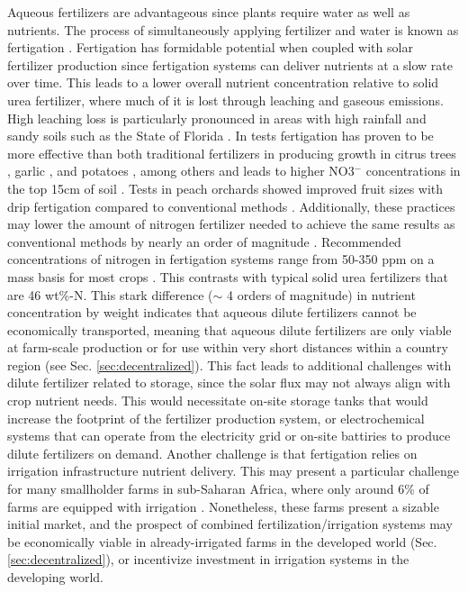 Aqueous fertilizers are advantageous since plants require water as well as nutrients. The process of simultaneously applying fertilizer and water is known as fertigation \cite{kafkafi2011fertigation,goyal2016water}. Fertigation has formidable potential when coupled with solar fertilizer production since fertigation systems can deliver nutrients at a slow rate over time. This leads to a lower overall nutrient concentration relative to solid urea fertilizer, where much of it is lost through leaching and gaseous emissions. High leaching loss is particularly pronounced in areas with high rainfall and sandy soils such as the State of Florida \cite{kadyampakeni_2015}. In tests fertigation has proven to be more effective than both traditional fertilizers in producing growth in citrus trees \cite{Morgan2009}, garlic \cite{Jamil_Mohammad_2002}, and potatoes \cite{Feng_2017}, among others \cite{Bar_Yosef_1999,kafkafi2011fertigation} and leads to higher NO3$^-$ concentrations in the top 15cm of soil \cite{Willis1991}. Tests in peach orchards showed improved fruit sizes with drip fertigation compared to conventional methods \cite{Bryla2005}. Additionally, these practices may lower the amount of nitrogen fertilizer needed to achieve the same results as conventional methods by nearly an order of magnitude \cite{kadyampakeni_2015}. 
Recommended concentrations of nitrogen in fertigation systems range from 50-350 ppm on a mass basis for most crops \cite{phocaides2007handbook,Papadopoulos_1988}. This contrasts with typical solid urea fertilizers that are 46 wt\%-N. This stark difference ($\sim$ 4 orders of magnitude) in nutrient concentration by weight indicates that aqueous dilute fertilizers cannot be economically transported, meaning that aqueous dilute fertilizers are only viable at farm-scale production or for use within very short distances within a country region (see Sec. \ref{sec:decentralized}). This fact leads to additional challenges with dilute fertilizer related to storage, since the solar flux may not always align with crop nutrient needs. This would necessitate on-site storage tanks that would increase the footprint of the fertilizer production system, or electrochemical systems that can operate from the electricity grid or on-site battiries to produce dilute fertilizers on demand. Another challenge is that fertigation relies on irrigation infrastructure nutrient delivery. This may present a particular challenge for many smallholder farms in sub-Saharan Africa, where only around 6\%  of farms are equipped with irrigation \cite{You_2011}. Nonetheless, these farms present a sizable initial market, and the prospect of combined fertilization/irrigation systems may be economically viable in already-irrigated farms in the developed world (Sec. \ref{sec:decentralized}), or incentivize investment in irrigation systems in the developing world.

